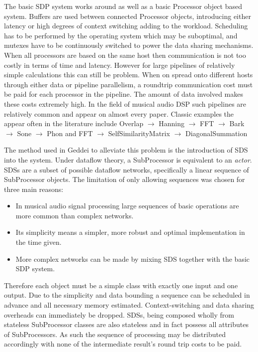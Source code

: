 The basic SDP system works around as well as a basic Processor object based system. Buffers are used between connected Processor objects, introducing either latency or high degrees of context switching adding to the workload. Scheduling has to be performed by the operating system which may be suboptimal, and mutexes have to be continuously switched to power the data sharing mechanisms. When all processors are based on the same host then communication is not too costly in terms of time and latency. However for large pipelines of relatively simple calculations this can still be problem. When on spread onto different hosts through either data or pipeline parallelism, a roundtrip communication cost must be paid for each processor in the pipeline. The amount of data involved makes these costs extremely high. In the field of musical audio DSP such pipelines are relatively common and appear on almost every paper. Classic examples the appear often in the literature include Overlap $\rightarrow$ Hanning $\rightarrow$ FFT $\rightarrow$ Bark $\rightarrow$ Sone $\rightarrow$ Phon and FFT $\rightarrow$ SelfSimilarityMatrix $\rightarrow$ DiagonalSummation

The method used in Geddei to alleviate this problem is the introduction of SDS into the system. Under dataflow theory, a SubProcessor is equivalent to an \textit{actor}. SDSs are a subset of possible dataflow networks, specifically a linear sequence of SubProcessor objects. The limitation of only allowing sequences was chosen for three main reasons:

\begin{itemize}
\item In musical audio signal processing large sequences of basic operations are more common than complex networks.
\item Its simplicity means a simpler, more robust and optimal implementation in the time given.
\item More complex networks can be made by mixing SDS together with the basic SDP system.
\end{itemize}

Therefore each object must be a simple class with exactly one input and one output. Due to the simplicity and data bounding a sequence can be scheduled in advance and all necessary memory estimated. Context-switching and data sharing overheads can immediately be dropped. SDSs, being composed wholly from stateless SubProcessor classes are also stateless and in fact possess all attributes of SubProcessors. As such the sequence of processing may be distributed accordingly with none of the intermediate result's round trip costs to be paid.

